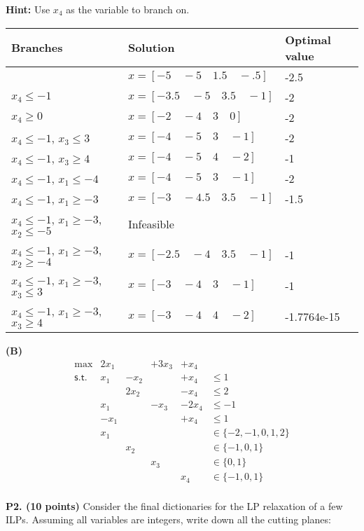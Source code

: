 \documentclass[11pt]{article}
\begin{document}
\noindent\textbf{Hint:} Use $x_4$ as the variable to branch on.
\\
\begin{tabular}{|l|l|l|}
\hline
Branches & Solution & Optimal value \\ \hline
& $x = [-5\quad-5\quad1.5\quad-.5]$ & -2.5 \\ \hline
$x_4 \leq -1$ & $x = [-3.5\quad-5\quad3.5\quad-1]$ & -2\\ \hline
$x_4 \geq 0$ & $x = [-2\quad-4\quad3\quad0]$ & -2 \\ \hline
$x_4 \leq -1$, $x_3 \leq 3$ & $x = [-4\quad-5\quad3\quad-1]$ & -2 \\ \hline
$x_4 \leq -1$, $x_3 \geq 4$ & $x = [-4\quad-5\quad4\quad-2]$ & -1 \\ \hline
$x_4 \leq -1$, $x_1 \leq -4$ & $x = [-4\quad-5\quad3\quad-1]$ & -2 \\ \hline
$x_4 \leq -1$, $x_1 \geq -3$ & $x = [-3\quad-4.5\quad3.5\quad-1]$ & -1.5 \\ \hline
$x_4 \leq -1$, $x_1 \geq -3$, $x_2 \leq -5$ & Infeasible & \\ \hline
$x_4 \leq -1$, $x_1 \geq -3$, $x_2 \geq -4$ & $x = [-2.5\quad-4\quad3.5\quad-1]$ & -1\\ \hline
$x_4 \leq -1$, $x_1 \geq -3$, $x_3 \leq 3$ & $x = [-3\quad-4\quad3\quad-1]$ & -1\\ \hline
$x_4 \leq -1$, $x_1 \geq -3$, $x_3 \geq 4$ & $x = [-3\quad-4\quad4\quad-2]$ & -1.7764e-15\\ \hline
\end{tabular}

\noindent\textbf{(B)} 
\[ \begin{array}{rlllll}
\max & 2 x_1 &  & + 3 x_3 & + x_4 \\
\mathsf{s.t.}  & x_1 & - x_2 &  & + x_4 & \leq 1 \\
&  & 2 x_2 &  & - x_4 & \leq 2 \\
& x_1 &  & - x_3 & - 2 x_4 & \leq -1 \\
& -x_1 & &   & + x_4 & \leq 1\\
& x_1 &  &   &    & \in \{ -2,-1, 0, 1,2 \} \\
&   & x_2 &  &    & \in \{ -1, 0, 1 \} \\
&   &     & x_3 & & \in \{ 0, 1\} \\
&   &     &    & x_4 & \in \{ -1, 0, 1\} \\
\end{array}\]



\noindent\textbf{P2. (10 points)}  Consider the final dictionaries for 
the LP relaxation of a few ILPs.  Assuming all variables are integers,
write down all the cutting planes:
\end{document}
